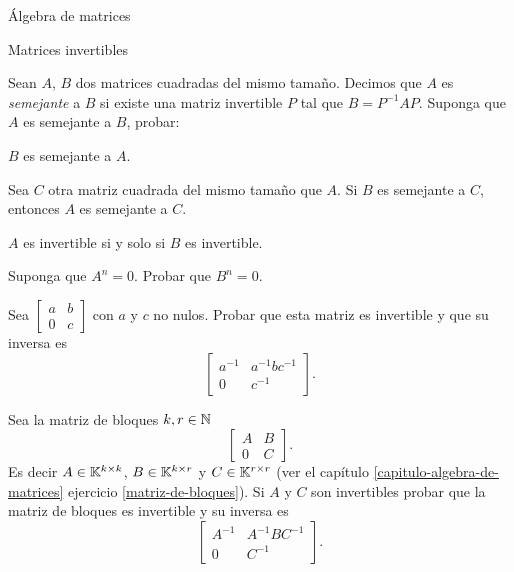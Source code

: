 \begin{chapter}{\'Algebra de matrices}
\begin{section}{Matrices invertibles}
\begin{enumex}
                \item\label{matrices-semejantes} Sean $A$, $B$ dos matrices cuadradas del mismo tamaño. Decimos que $A$ es \textit{semejante} a $B$ si existe una matriz invertible $P$ tal que $B = P^{-1} A P$. Suponga que $A$ es semejante a $B$, probar:
                \begin{enumex}
                    \item $B$ es semejante a $A$.
                    \item Sea $C$ otra matriz cuadrada del mismo tamaño que $A$. Si  $B$ es semejante a $C$, entonces $A$  es semejante a $C$.
                    \item $A$ es invertible si y solo si $B$ es invertible.
                    \item Suponga que $A^n = 0$. Probar que $B^n=0$.
                \end{enumex}
                
                \item Sea $\begin{bmatrix}
                    a & b \\ 0 &c
                \end{bmatrix}$ con $a$ y $c$ no nulos. Probar que esta matriz es invertible y que su inversa es 
                $$
                \begin{bmatrix}
                    a^{-1} &  a^{-1} b  c^{-1} \\
                    0 &  c^{-1}
                \end{bmatrix}. 
                $$
                \item Sea la matriz de bloques $k,r \in \mathbb N$
                $$
                 \begin{bmatrix}
                    A & B \\ 0 & C
                \end{bmatrix}.
                $$
                Es decir $A \in \mathbb K^{k \times k}$, $B \in \mathbb K^{k \times r}$ y $C \in \mathbb K^{r \times r}$ (ver el capítulo \ref{capitulo-algebra-de-matrices} ejercicio \ref{matriz-de-bloques}). Si $A$ y $C$ son invertibles probar que la matriz de bloques es invertible y su inversa es 
                $$
                \begin{bmatrix}
                    A^{-1} &  A^{-1} B  C^{-1} \\
                    0 &  C^{-1}
                \end{bmatrix}. 
                $$
            \end{enumex}
        \end{section}
        

\end{chapter}

